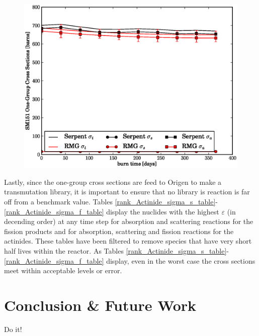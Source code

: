 \begin{figure}[htbp]
\begin{center}
\includegraphics[scale=0.3]{multigroup_method/figs/benchmark/SM151_1g_xs.eps}
\end{center}
\end{figure}

Lastly, since the one-group cross sections are feed to Origen to make a transmutation library, it is important 
to ensure that no library is reaction is far off from a benchmark value.  Tables 
\ref{rank_Actinide_sigma_s_table}-\ref{rank_Actinide_sigma_f_table} display the 
nuclides with the highest $\varepsilon$ (in decending order) at any time step for absorption and scattering
reactions for the fission products and for absorption, scattering and fission reactions for the actinides.
These tables have been filtered to remove species that have very short half lives within the reactor.
As Tables \ref{rank_Actinide_sigma_s_table}-\ref{rank_Actinide_sigma_f_table} display, even in the worst case 
the cross sections meet within acceptable levels or error.








\section{Conclusion \& Future Work}
Do it!

